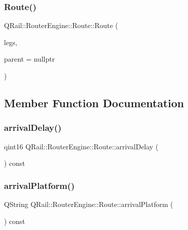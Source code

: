 \subsubsection{\texorpdfstring{Route()}{Route()}\hspace{0.1cm}{\footnotesize\ttfamily [2/2]}}
{\footnotesize\ttfamily Q\+Rail\+::\+Router\+Engine\+::\+Route\+::\+Route (\begin{DoxyParamCaption}\item[{const Q\+List$<$ \mbox{\hyperlink{classQRail_1_1RouterEngine_1_1RouteLeg}{Route\+Leg}} $\ast$ $>$ \&}]{legs,  }\item[{Q\+Object $\ast$}]{parent = {\ttfamily nullptr} }\end{DoxyParamCaption})\hspace{0.3cm}{\ttfamily [explicit]}}



\subsection{Member Function Documentation}
\mbox{\label{classQRail_1_1RouterEngine_1_1Route_a98ab7ca5c9bb67348f64eae41750f86f}} 
\subsubsection{\texorpdfstring{arrivalDelay()}{arrivalDelay()}}
{\footnotesize\ttfamily qint16 Q\+Rail\+::\+Router\+Engine\+::\+Route\+::arrival\+Delay (\begin{DoxyParamCaption}{ }\end{DoxyParamCaption}) const}

\mbox{\label{classQRail_1_1RouterEngine_1_1Route_a0d6710f4d8de4c5cb6cb0497c07e0a13}} 
\subsubsection{\texorpdfstring{arrivalPlatform()}{arrivalPlatform()}}
{\footnotesize\ttfamily Q\+String Q\+Rail\+::\+Router\+Engine\+::\+Route\+::arrival\+Platform (\begin{DoxyParamCaption}{ }\end{DoxyParamCaption}) const}

